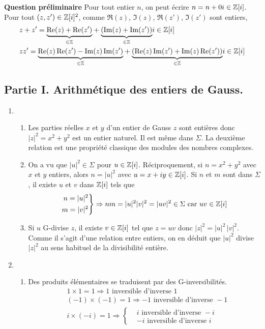 \textbf{Question préliminaire}
Pour tout entier $n$, on peut écrire $n = n +0i\in \mathbb{Z}[i]$. Pour tout $(z,z')\in \mathbb{Z}[i]^2$, comme $\Re(z)$, $\Im(z)$, $\Re(z')$, $\Im(z')$ sont entiers,  
\begin{align*}
  &z+z' = \underset{\in \mathbb{Z}}{\underbrace{\operatorname{Re}(z)+\operatorname{Re}(z')}} +\underset{\in \mathbb{Z}}{\underbrace{(\operatorname{Im}(z) + \operatorname{Im}(z'))}}i \in \mathbb{Z}[i] \\
  &z z' = \underset{\in \mathbb{Z}}{\underbrace{\operatorname{Re}(z)\operatorname{Re}(z')-\operatorname{Im}(z)\operatorname{Im}(z')}} +\underset{\in \mathbb{Z}}{\underbrace{(\operatorname{Re}(z)\operatorname{Im}(z')+\operatorname{Im}(z)\operatorname{Re}(z'))}}i \in \mathbb{Z}[i]
\end{align*}

\subsection*{Partie I. Arithmétique des entiers de Gauss.}
\begin{enumerate}
\item
\begin{enumerate}
  \item Les parties réelles $x$ et $y$ d'un entier de Gauss $z$ sont entières donc $|z|^2 = x^2+y^2$ est un entier naturel. Il est même dans $\Sigma$. La deuxième relation est une propriété classique des modules des nombres complexes.

  \item On a vu que $|u|^2\in \Sigma$ pour $u\in \mathbb{Z}[i]$. Réciproquement, si $n=x^2+y^2$ avec $x$ et $y$ entiers, alors $n=|u|^2$ avec $u=x+iy\in \mathbb{Z}[i]$.\newline
Si $n$ et $m$ sont dans $\Sigma$, il existe $u$ et $v$ dans $\mathbb{Z}[i]$ tels que 
\begin{displaymath}
  \left. 
\begin{aligned}
  n = |u|^2 \\ m = |v|^2
\end{aligned}
\right\rbrace \Rightarrow
nm = |u|^2|v|^2 = |uv|^2 \in \Sigma \text{ car } uv\in\mathbb{Z}[i]
\end{displaymath}

 \item Si $u$ G-divise $z$, il existe $v\in \mathbb{Z}[i]$ tel que $z=uv$ donc $|z|^2 = |u|^2\, |v|^2$. Comme il s'agit d'une relation entre entiers, on en déduit que $|u|^2$ divise $|z|^2$ au sens habituel de la divisibilité entière.
\end{enumerate}

\item
\begin{enumerate}
  \item Des produits élémentaires se traduisent par des G-inversibilités.
\begin{align*}
& 1\times1 = 1 \Rightarrow 1 \text{ inversible d'inverse } 1 \\
& (-1)\times(-1) = 1 \Rightarrow -1 \text{ inversible d'inverse } -1 \\
& i\times(-i) = 1 \Rightarrow
\left\lbrace
\begin{aligned}
&i \text{ inversible d'inverse } -i\\
&-i \text{ inversible d'inverse } i
\end{aligned}
\right. 
\end{align*}


\end{enumerate}
\end{enumerate}
